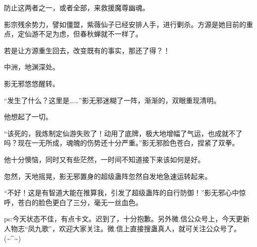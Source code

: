 \begin{this_body}
防止这两者之一，或者全部，来救援魔尊幽魂。

影宗残余势力，譬如僵盟，紫薇仙子已经安排人手，进行剿杀。方源是她目前的重点，定仙游不足为虑，但春秋蝉就不一样了。

若是让方源重生回去，改变既有的事实，那还了得？！

中洲，地渊深处。

影无邪悠悠醒转。

“发生了什么？这里是……”影无邪迷糊了一阵，渐渐的，双眼重现清明。

他想起了一切。

“该死的，我炼制定仙游失败了！动用了底牌，极大地增幅了气运，也成就不了吗？现在一无所成，魂魄的伤势还十分严重。”影无邪脸色苍白，捏紧了双拳。

他十分懊恼，同时又有些茫然，一时间不知道接下来该如何是好。

忽然，天地摇晃，影无邪置身的超级蛊阵忽然自发地急速运转起来。

“不好！这是有智道大能在推算我，引发了超级蛊阵的自行防御！”影无邪心中惊呼，苍白的脸色更白了三分，毫无一丝血色。

ps:今天状态不佳，有点卡文。迟到了，十分抱歉。另外微.信公众号上，今天更新人物志“凤九歌”，欢迎大家关注。微.信上直接搜蛊真人，就可关注公众号了。(\~{}\^{}\~{})

\end{this_body}

